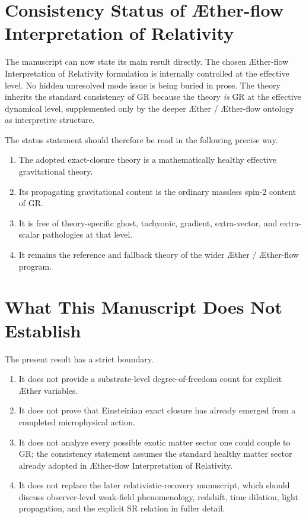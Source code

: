 \documentclass[11pt]{article}
\newcommand{\Aether}{\AE{}ther}
\newcommand{\Aflow}{\AE{}ther-flow}
\newcommand{\TheoryName}{\Aflow{} Interpretation of Relativity}
\begin{document}
\section{Consistency Status of \TheoryName{}}

The manuscript can now state its main result directly. The chosen \TheoryName{} formulation is internally controlled at the effective level. No hidden unresolved mode issue is being buried in prose. The theory inherits the standard consistency of GR because the theory \emph{is} GR at the effective dynamical level, supplemented only by the deeper \Aether{} / \Aflow{} ontology as interpretive structure.

The status statement should therefore be read in the following precise way.
\begin{enumerate}
    \item The adopted exact-closure theory is a mathematically healthy effective gravitational theory.
    \item Its propagating gravitational content is the ordinary massless spin-2 content of GR.
    \item It is free of theory-specific ghost, tachyonic, gradient, extra-vector, and extra-scalar pathologies at that level.
    \item It remains the reference and fallback theory of the wider \Aether{} / \Aflow{} program.
\end{enumerate}

\section{What This Manuscript Does Not Establish}

The present result has a strict boundary.
\begin{enumerate}
    \item It does not provide a substrate-level degree-of-freedom count for explicit \Aether{} variables.
    \item It does not prove that Einsteinian exact closure has already emerged from a completed microphysical action.
    \item It does not analyze every possible exotic matter sector one could couple to GR; the consistency statement assumes the standard healthy matter sector already adopted in \TheoryName{}.
    \item It does not replace the later relativistic-recovery manuscript, which should discuss observer-level weak-field phenomenology, redshift, time dilation, light propagation, and the explicit SR relation in fuller detail.
\end{enumerate}
\end{document}
